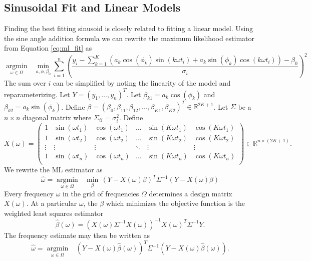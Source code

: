 \documentclass[ejs,ps,preprint]{imsart}
\numberwithin{equation}{section}
\theoremstyle{plain}
\newcommand{\V}[1]{#1} %
\newcommand{\M}[1]{#1} %
\newcommand{\argmin}[1]{\underset{#1}{\operatorname{argmin}}\text{ }}
\begin{document}
\subsection{Sinusoidal Fit and Linear Models}
Finding the best fitting sinusoid is closely related to fitting a linear model. Using the sine angle addition formula we can rewrite the maximum likelihood estimator from Equation \eqref{eq:ml_fit} as
\begin{equation*}
\argmin{\omega \in \Omega} \min_{\V{a},\V{\phi},\beta_0} \sum_{i=1}^{n} \left(\frac{y_{i} - \sum_{k=1}^K (a_{k}\cos(\phi_{k})\sin(k\omega t_{i})  + a_{k}\sin(\phi_{k})\cos(k\omega t_{i})) - \beta_{0}}{\sigma_{i}}\right)^2
\end{equation*}
The sum over $i$ can be simplified by noting the linearity of the model and reparameterizing. Let $Y = (y_{1},\ldots,y_{n})^T$. Let $\beta_{k1} = a_{k}\cos(\phi_{k})$ and $\beta_{k2} = a_{k}\sin(\phi_{k})$. Define $\beta = (\beta_{0},\beta_{11},\beta_{12},\ldots,\beta_{K1},\beta_{K2})^T \in \mathbb{R}^{2K+1}$. Let $\M{\Sigma}$ be a $n \times n$ diagonal matrix where $\Sigma_{ii} = \sigma_{i}^2$. Define
\begin{equation*}
\M{X}(\omega) = \begin{pmatrix}
 1 & \sin(\omega t_{1}) & \cos(\omega t_{1}) & \dots  & \sin(K\omega t_{1}) & \cos(K\omega t_{1}) \\
 1 & \sin(\omega t_{2}) & \cos(\omega t_{2}) & \dots  & \sin(K\omega t_{2}) & \cos(K\omega t_{2}) \\
 \vdots  & \vdots  &\vdots  &\ddots & \vdots & \vdots  \\
 1 & \sin(\omega t_{n}) & \cos(\omega t_{n}) & \dots  & \sin(K\omega t_{n}) & \cos(K\omega t_{n}) \\
\end{pmatrix} \in \mathbb{R}^{n \times (2K+1)}.
\end{equation*}
We rewrite the ML estimator as
\begin{equation*}
\widehat{\omega} = \argmin{\omega \in \Omega} \min_{\V{\beta}} \, (\V{Y} - \M{X}(\omega)\V{\beta})^T\M{\Sigma}^{-1}(\V{Y} - \M{X}(\omega)\V{\beta})
\end{equation*}
Every frequency $\omega$ in the grid of frequencies $\Omega$ determines a design matrix $\M{X}(\omega)$. At a particular $\omega$, the $\beta$ which minimizes the objective function is the weighted least squares estimator
\begin{equation}
\label{eq:beta_est}
\widehat{\V{\beta}}(\omega) = (\M{X}(\omega)\M{\Sigma}^{-1}\M{X}(\omega))^{-1}\M{X}(\omega)^T\M{\Sigma}^{-1}Y.
\end{equation}
The frequency estimate may then be written as
\begin{equation}
\label{eq:freq_est}
\widehat{\omega} = \argmin{\omega \in \Omega}  \, (\V{Y} - \M{X}(\omega)\widehat{\V{\beta}}(\omega))^T\M{\Sigma}^{-1}(\V{Y} - \M{X}(\omega)\widehat{\V{\beta}}(\omega)).
\end{equation}
\end{document}
